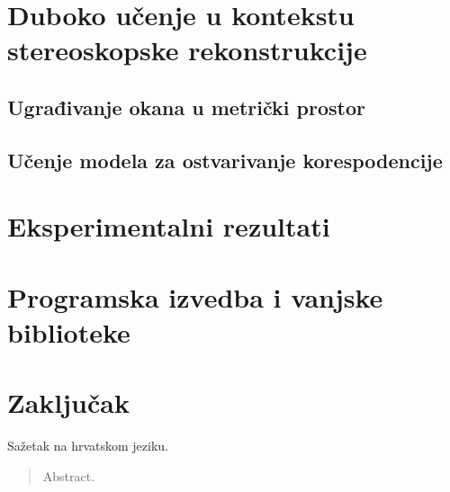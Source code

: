 \documentclass[times, utf8, zavrsni, numeric]{fer}
\begin{document}
\chapter{Duboko učenje u kontekstu stereoskopske rekonstrukcije}
\section{Ugrađivanje okana u metrički prostor}
\section{Učenje modela za ostvarivanje korespodencije}
\chapter{Eksperimentalni rezultati}
\chapter{Programska izvedba i vanjske biblioteke}
\chapter{Zaključak}





\begin{sazetak}
Sažetak na hrvatskom jeziku.

\end{sazetak}

\begin{abstract}
Abstract.

\end{abstract}
\end{document}
